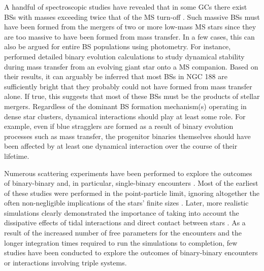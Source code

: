 A handful of spectroscopic
studies have revealed that in some GCs there exist BSs with
masses exceeding twice that of the MS turn-off \citep[e.g.][]{shara97,
  knigge08}.  Such massive BSs must have been formed from the
mergers of two or more low-mass MS stars since they
are too massive to have been formed from mass transfer.  In a few 
cases, this can also
be argued for entire BS populations using photometry.  For instance,
\citet{chen08b} performed detailed binary evolution calculations to
study dynamical stability during mass transfer from an evolving
giant star onto a MS 
companion.  Based on their results, it can arguably be inferred that
most BSs in NGC 188 are sufficiently bright that they probably could
not have formed from 
mass transfer alone.  If true, this suggests that most of these BSs
must be the products of stellar mergers.  Regardless of
the dominant BS formation mechanism(s) operating in dense star clusters,
dynamical interactions should play at least some role.  For example,
even if blue stragglers are formed as a result of binary evolution
processes such as mass transfer, the progenitor binaries themselves
should have been affected by at least one dynamical
interaction over the course of their lifetime.

Numerous scattering experiments have been performed to
explore the outcomes of binary-binary and, in particular,
single-binary encounters 
\citep[e.g.][]{mcmillan86, sigurdsson93, fregeau04}.  Most of the
earliest of these studies were 
performed in the point-particle limit, ignoring altogether the often
non-negligible implications of the stars' finite sizes
\citep[e.g.][]{hut83b, mikkola83}.  Later, more realistic
simulations clearly demonstrated the importance of taking into account
the dissipative effects of tidal interactions and direct contact
between stars \citep[e.g.][]{mcmillan87, cleary90}.  As a result of
the increased number 
of free parameters for the encounters and the longer integration times
required to run the simulations to completion, few studies have been
conducted to explore the outcomes of binary-binary encounters or
interactions involving triple systems.

